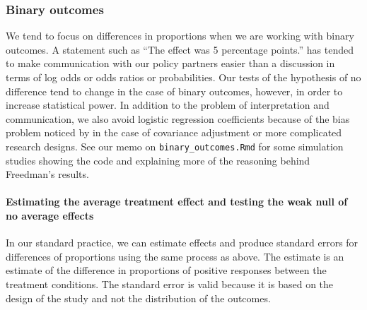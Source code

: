 \documentclass[
  12pt,
]{book}
\theoremstyle{definition}
\theoremstyle{definition}
\theoremstyle{definition}
\theoremstyle{remark}
\begin{document}
\hypertarget{binary-outcomes}{%
\subsubsection{Binary outcomes}\label{binary-outcomes}}

We tend to focus on differences in proportions when we are working with
binary outcomes. A statement such as ``The effect was 5 percentage
points.'' has tended to make communication with our policy partners
easier than a discussion in terms of log odds or odds ratios or
probabilities. Our tests of the hypothesis of no difference tend to
change in the case of binary outcomes, however, in order to increase
statistical power. In addition to the problem of interpretation and
communication, we also avoid logistic regression coefficients because of
the bias problem noticed by \citet{freedman2008randomization} in the
case of covariance adjustment or more complicated research designs. See
our memo on \texttt{binary\_outcomes.Rmd} for some simulation studies
showing the code and explaining more of the reasoning behind Freedman's
results.

\hypertarget{estimating-the-average-treatment-effect-and-testing-the-weak-null-of-no-average-effects-1}{%
\paragraph{Estimating the average treatment effect and testing the weak
null of no average
effects}\label{estimating-the-average-treatment-effect-and-testing-the-weak-null-of-no-average-effects-1}}

In our standard practice, we can estimate effects and produce standard
errors for differences of proportions using the same process as above.
The estimate is an estimate of the difference in proportions of positive
responses between the treatment conditions. The standard error is valid
because it is based on the design of the study and not the distribution
of the outcomes.
\end{document}
